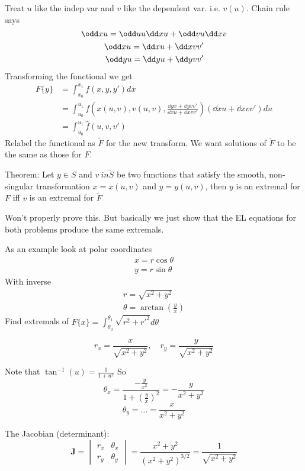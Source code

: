 \documentclass{E:/Documents/Latex/myassignment}
\begin{document}
Treat $u$ like the indep var and $v$ like the dependent var. i.e. $v(u)$.
Chain rule says
\[\odd xu = \odd uu \dd x u + \odd vu \dd xv\]
\begin{align*}
	\odd xu = \dd x u + \dd x v v'\\
	\odd yu = \dd y u + \dd y v v'
\end{align*}
Transforming the functional we get
\begin{align*}
	F\{y\} &= \int_{x_0}^{x_1} f(x,y,y') dx\\
	&= \int_{u_0}^{u_1} f\left(x(u,v), v(u,v), \frac{\dd yx + \dd yv v'}{\dd xu + \dd xv v'}\right) (\dd xu + \dd xv v')  du\\
	&= \int_{u_0}^{u_1} \hat{f}(u,v,v')
\end{align*}
Relabel the functional as $\tilde{F}$ for the new transform. We want solutions of $\tilde{F}$ to be the same as those for $F$.

Theorem:
Let $y \in S$ and $v \ in \tilde{S}$ be two functions that satisfy the smooth, non-singular transformation $x= x(u,v)$ and $y = y(u,v)$, then $y$ is an extremal for $F$ iff $v$ is an extremal for $\tilde{F}$

Won't properly prove this. But basically we just show that the EL equations for both problems produce the same extremals.






As an example look at polar coordinates
\begin{align*}
	x = r\cos\theta\\
	y = r\sin\theta
\end{align*}
With inverse
\begin{align*}
	r = \sqrt{x^2+y^2}\\
	\theta = \arctan\left(\frac yx\right)
\end{align*}
Find extremals of $F\{x\} = \int_{\theta_0}^{\theta_1} \sqrt{r^2 + r'^2} d\theta$


\[r_x = \frac{x}{\sqrt{x^2+y^2}}, \quad r_y = \frac{y}{\sqrt{x^2+y^2}}\]

Note that $\tan^{-1}(u) = \frac{1}{1+u^2}$
So
\[\theta_x = \frac{-\frac y{x^2}}{1 + \left(\frac yx\right)^2} = -\frac{y}{x^2+y^2}\]
\[\theta_y = \ldots = \frac{x}{x^2+y^2}\]

The Jacobian (determinant):
\[\mathbf{J} = \begin{vmatrix}
	r_x & \theta_x \\ r_y & \theta_y
\end{vmatrix} = \frac{x^2 + y^2}{(x^2+y^2)^{3/2}}  = \frac{1}{\sqrt{x^2+y^2}}\]
\end{document}
